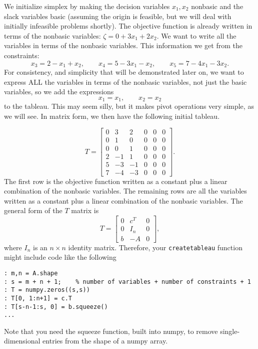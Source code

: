 We initialize simplex by making the decision variables $x_1, x_2$ nonbasic and the slack variables basic (assuming the origin is feasible, but we will deal with initially infeasible problems shortly).
The objective function is already written in terms of the nonbasic variables: $\zeta = 0 + 3x_1 + 2x_2$.
We want to write all the variables in terms of the nonbasic variables. This information we get from the constraints:
\[ x_3 = 2 - x_1 + x_2, \qquad x_4 = 5 - 3x_1 - x_2, \qquad x_5 = 7 - 4x_1 - 3x_2. \]
For consistency, and simplicity that will be demonstrated later on, we want to express ALL the variables in terms of the nonbasic variables, not just the basic variables, so we add the expressions
\[ x_1 = x_1, \qquad x_2 = x_2 \]
to the tableau.
This may seem silly, but it makes pivot operations very simple, as we will see.
In matrix form, we then have the following initial tableau.

\[
	T = \begin{bmatrix}
		0 & 3 & 2 & 0 & 0 & 0 \\
		0 & 1 & 0 & 0 & 0 & 0 \\
		0 & 0 & 1 & 0 & 0 & 0 \\
		2 &-1 & 1 & 0 & 0 & 0 \\
		5 &-3 &-1 & 0 & 0 & 0 \\
		7 &-4 &-3 & 0 & 0 & 0
	\end{bmatrix}.
\]
The first row is the objective function written as a constant plus a linear combination of the nonbasic variables.
The remaining rows are all the variables written as a constant plus a linear combination of the nonbasic variables.
The general form of the $T$ matrix is
\[ T = \begin{bmatrix}
    0 & c^T   & 0 \\
    0 & I_n & 0 \\
    b & -A  & 0
\end{bmatrix}, \]
where $I_n$ is an $n \times n$ identity matrix.
Therefore, your {\tt createtableau} function might include code like the following

\begin{lstlisting}
: m,n = A.shape
: s = m + n + 1;    % number of variables + number of constraints + 1
: T = numpy.zeros((s,s))
: T[0, 1:n+1] = c.T
: T[s-n-1:s, 0] = b.squeeze()
...
\end{lstlisting}

Note that you need the squeeze function, built into numpy, to remove single-dimensional entries from the shape of a numpy array. 


